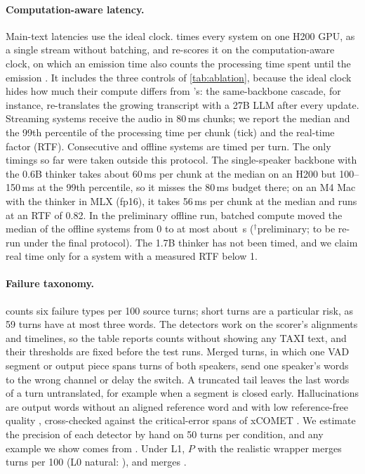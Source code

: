 \paragraph{Computation-aware latency.}
Main-text latencies use the ideal clock.  times every system on one H200 GPU, as a single stream without batching, and re-scores it on the computation-aware clock, on which an emission time also counts the processing time spent until the emission \citep{ma2020simulmt}. It includes the three controls of \cref{tab:ablation}, because the ideal clock hides how much their compute differs from \model's: the same-backbone cascade, for instance, re-translates the growing transcript with a 27B LLM after every update. Streaming systems receive the audio in 80\,ms chunks; we report the median and the 99th percentile of the processing time per chunk (tick) and the real-time factor (RTF). Consecutive and offline systems are timed per turn. The only timings so far were taken outside this protocol. The single-speaker backbone with the 0.6B thinker takes about 60\,ms per chunk at the median on an H200 but 100--150\,ms at the 99th percentile, so it misses the 80\,ms budget there; on an M4 Mac with the thinker in MLX (fp16), it takes 56\,ms per chunk at the median and runs at an RTF of 0.82. In the preliminary offline run, batched compute moved the median \eo of the offline systems from 0 to at most about \,s ($^\dagger$preliminary; to be re-run under the final protocol). The 1.7B thinker has not been timed, and we claim real time only for a system with a measured RTF below 1.



\paragraph{Failure taxonomy.}
 counts six failure types per 100 source turns; short turns are a particular risk, as 59 \taxi turns have at most three words. The detectors work on the scorer's alignments and timelines, so the table reports counts without showing any TAXI text, and their thresholds are fixed before the test runs. Merged turns, in which one VAD segment or output piece spans turns of both speakers, send one speaker's words to the wrong channel or delay the switch. A truncated tail leaves the last words of a turn untranslated, for example when a segment is closed early. Hallucinations are output words without an aligned reference word and with low reference-free quality \citep{rei2022cometkiwi}, cross-checked against the critical-error spans of xCOMET \citep{guerreiro2024xcomet}. We estimate the precision of each detector by hand on 50 \syn turns per condition, and any example we show comes from \syn. Under L1, $P$ with the realistic wrapper merges \tbdtext{} turns per 100 (L0 natural: \tbdtext{}), and \model merges \tbdtext{}.


